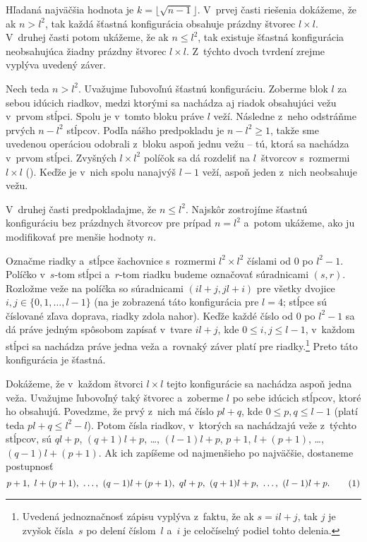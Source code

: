 {%
Hľadaná najväčšia hodnota je $k=\lfloor \sqrt{n-1} \rfloor$. V~prvej časti riešenia dokážeme, že ak $n>l^2$, tak každá šťastná konfigurácia obsahuje prázdny štvorec ${l\times l}$. V~druhej časti potom ukážeme, že ak $n\le l^2$, tak existuje šťastná konfigurácia neobsahujúca žiadny prázdny štvorec $l\times l$. Z~týchto dvoch tvrdení zrejme vyplýva uvedený záver.

\smallskip
Nech teda $n > l^2$. Uvažujme ľubovoľnú šťastnú konfiguráciu. Zoberme blok $l$ za sebou idúcich riadkov, medzi ktorými sa nachádza aj riadok obsahujúci vežu v~prvom stĺpci. Spolu je v~tomto bloku práve $l$ veží. Následne z~neho odstráňme prvých $n-l^2$ stĺpcov. Podľa nášho predpokladu je $n-l^2 \ge 1$, takže sme uvedenou operáciou odobrali z~bloku aspoň jednu vežu -- tú, ktorá sa nachádza v~prvom stĺpci. Zvyšných $l\times l^2$ políčok sa dá rozdeliť na $l$~štvorcov s~rozmermi $l\times l$ (\obr). Keďže je v~nich spolu nanajvýš $l-1$ veží, aspoň jeden z~nich neobsahuje vežu.
%

\smallskip
V~druhej časti predpokladajme, že $n\le l^2$. Najskôr zostrojíme šťastnú konfiguráciu bez prázdnych štvorcov pre prípad $n=l^2$ a~potom ukážeme, ako ju modifikovať pre menšie hodnoty $n$.

Označme riadky a~stĺpce šachovnice s~rozmermi $l^2\times l^2$ číslami od $0$ po $l^2-1$. Políčko v~$s$-tom stĺpci a~$r$-tom riadku budeme označovať súradnicami $(s,r)$. Rozložme veže na políčka so súradnicami
$(il+j,jl+i)$ pre všetky dvojice $i,j\in\{0,1,\dots,l-1\}$ (na \obr{} je zobrazená táto konfigurácia pre $l=4$; stĺpce sú číslované zľava doprava, riadky zdola nahor).
Keďže každé číslo od $0$ po $l^2-1$ sa dá práve jedným spôsobom zapísať v~tvare $il+j$, kde $0 \le i,j \le l-1$, v~každom stĺpci sa nachádza práve jedna veža a~rovnaký záver platí pre riadky.\footnote{Uvedená jednoznačnosť zápisu vyplýva z~faktu, že ak $s=il+j$, tak $j$ je zvyšok čísla~$s$ po delení číslom~$l$ a~$i$ je celočíselný podiel tohto delenia.} Preto táto konfigurácia je šťastná.
%

Dokážeme, že v~každom štvorci $l\times l$ tejto konfigurácie sa nachádza aspoň jedna veža. Uvažujme ľubovoľný taký štvorec a~zoberme $l$ po sebe idúcich stĺpcov, ktoré ho obsahujú. Povedzme, že prvý z~nich má číslo $pl+q$, kde $0 \le p,q \le l-1$ (platí teda $pl+q \le l^2-l$). Potom čísla riadkov, v~ktorých sa nachádzajú veže z~týchto stĺpcov, sú $ql+p$, $(q+1)l + p$, \dots, $(l-1)l + p$, $p+1$, $l + (p+1)$, \dots, $(q-1)l+(p+1)$. Ak ich zapíšeme od najmenšieho po najväčšie, dostaneme postupnosť
$$
p+1,\ l + (p+1),\ \dots,\ (q-1)l+(p+1),\ ql+p,\ (q+1)l + p,\ \dots,\ (l-1)l + p.
\tag1
$$

}
